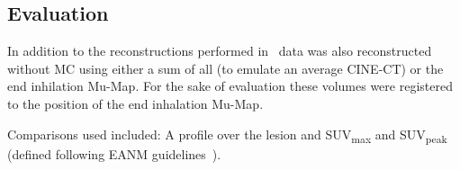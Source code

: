    \subsection{Evaluation} \label{sec:evaluation}
        In addition to the reconstructions performed in~ data was also reconstructed without \gls{MC} using either a sum of all  (to emulate an average CINE-CT) or the end inhilation \gls{Mu-Map}. For the sake of evaluation these volumes were registered to the position of the end inhalation \gls{Mu-Map}.
        
        Comparisons used included: A profile over the lesion and \gls{SUV}\textsubscript{max} and \gls{SUV}\textsubscript{peak} (defined following \gls{EANM} guidelines~\cite{Boellaard2015FDG2.0}).

\vspace{-0.4cm}

